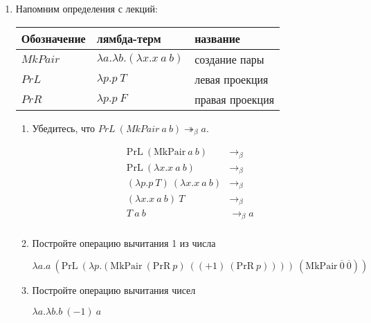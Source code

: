 \begin{enumerate}
    \item Напомним определения с лекций:

          \begin{tabular}{lll}
              Обозначение & лямбда-терм                               & название        \\\hline
              $MkPair$    & $\lambda a.\lambda b.(\lambda x.x\ a\ b)$ & создание пары   \\
              $PrL$       & $\lambda p.p\ T$                          & левая проекция  \\
              $PrR$       & $\lambda p.p\ F$                          & правая проекция \\\hline
          \end{tabular}

          \begin{enumerate}
              \item Убедитесь, что $PrL\ (MkPair\ a\ b) \twoheadrightarrow_\beta a$.
                    \begin{solution}
                        \begin{align*}
                            \mathrm{PrL}\ (\mathrm{MkPair}\ a\ b) & \to_\beta   \\
                            \mathrm{PrL}\ (\lambda x.x\ a\ b)     & \to_\beta   \\
                            (\lambda p.p\ T)\ (\lambda x.x\ a\ b) & \to_\beta   \\
                            (\lambda x.x\ a\ b)\ T                & \to_\beta   \\
                            T\ a\ b                               & \to_\beta a \\
                        \end{align*}
                    \end{solution}
              \item Постройте операцию вычитания 1 из числа
                    \begin{solution}
                        \(\lambda a.a\ (\mathrm{PrL}\ (\lambda p.(\mathrm{MkPair}\ (\mathrm{PrR}\ p)\ ((+1)\ (\mathrm{PrR}\ p))))\ (\mathrm{MkPair}\ \overline{0}\ \overline{0}))\)
                    \end{solution}
              \item Постройте операцию вычитания чисел
                    \begin{solution}
                        \(\lambda a.\lambda b.b\ (-1)\ a\)

\end{solution}
\end{enumerate}
\end{enumerate}
